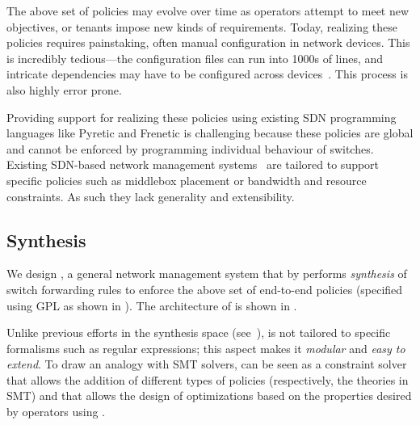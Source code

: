 
The above set of policies may evolve over time as operators attempt to
meet new objectives, or tenants impose new kinds of
requirements. Today, realizing these policies requires painstaking,
often manual configuration in network devices. This is incredibly
tedious---the configuration files can run into 1000s of lines, and
intricate dependencies may have to be configured across
devices~\cite{benson:complexity:nsdi2009,mpa-imc15}. This process is also highly 
error prone.

Providing support for realizing these policies using existing SDN
programming languages like Pyretic and Frenetic is challenging
because these policies are global and cannot be enforced by
programming individual behaviour of switches. Existing SDN-based
network management systems~\cite{simple,merlin,oneswitch} are tailored
to support specific policies such as middlebox placement or bandwidth
and resource constraints. As such they lack generality and
extensibility.

  
\subsection{Synthesis} \label{sec:synthesis} 



We design \name, a general network management system that 
by performs {\em synthesis} of switch forwarding
rules to enforce the above set of end-to-end policies (specified using 
GPL as shown in ). The architecture of \name
is shown in .

Unlike previous efforts in the synthesis space (see~\cite{netgen,merlin}), \Name is
not tailored to specific formalisms such as regular expressions; 
this aspect makes it {\em modular} and {\em easy to extend}.
To draw an analogy with SMT solvers, \Name can be seen as a constraint
solver that allows the addition of different types of policies
(respectively, the theories in SMT) and that allows the design of
optimizations based on the properties desired by 
  operators using \Name. 
  
